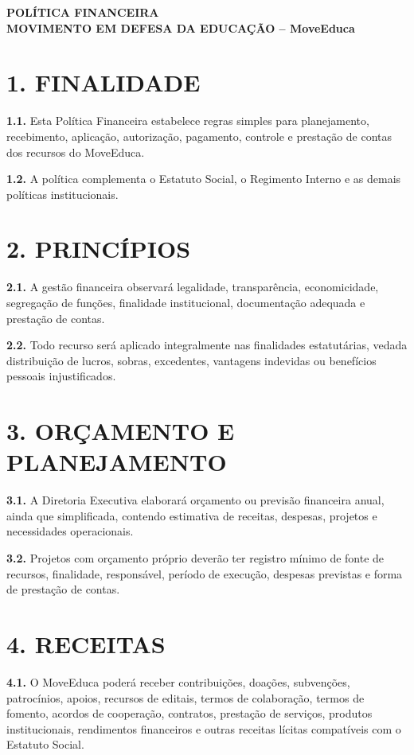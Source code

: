 \documentclass[11pt,a4paper]{article}
\begin{document}
\begin{center}
\textbf{\Large POLÍTICA FINANCEIRA}\\
\textbf{\large MOVIMENTO EM DEFESA DA EDUCAÇÃO -- MoveEduca}
\end{center}

\section*{1. FINALIDADE}

\textbf{1.1.} Esta Política Financeira estabelece regras simples para planejamento, recebimento, aplicação, autorização, pagamento, controle e prestação de contas dos recursos do MoveEduca.

\textbf{1.2.} A política complementa o Estatuto Social, o Regimento Interno e as demais políticas institucionais.

\section*{2. PRINCÍPIOS}

\textbf{2.1.} A gestão financeira observará legalidade, transparência, economicidade, segregação de funções, finalidade institucional, documentação adequada e prestação de contas.

\textbf{2.2.} Todo recurso será aplicado integralmente nas finalidades estatutárias, vedada distribuição de lucros, sobras, excedentes, vantagens indevidas ou benefícios pessoais injustificados.

\section*{3. ORÇAMENTO E PLANEJAMENTO}

\textbf{3.1.} A Diretoria Executiva elaborará orçamento ou previsão financeira anual, ainda que simplificada, contendo estimativa de receitas, despesas, projetos e necessidades operacionais.

\textbf{3.2.} Projetos com orçamento próprio deverão ter registro mínimo de fonte de recursos, finalidade, responsável, período de execução, despesas previstas e forma de prestação de contas.

\section*{4. RECEITAS}

\textbf{4.1.} O MoveEduca poderá receber contribuições, doações, subvenções, patrocínios, apoios, recursos de editais, termos de colaboração, termos de fomento, acordos de cooperação, contratos, prestação de serviços, produtos institucionais, rendimentos financeiros e outras receitas lícitas compatíveis com o Estatuto Social.
\end{document}
